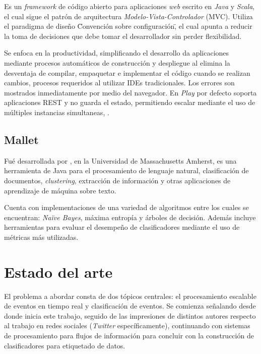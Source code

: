 Es un \textit{framework} de código abierto para aplicaciones \textit{web} escrito en \textit{Java} y \textit{Scala}, el cual sigue el patrón de arquitectura \textit{Modelo-Vista-Controlador} (MVC). Utiliza el paradigma de diseño \"Convención sobre configuración\", el cual apunta a reducir la toma de decisiones que debe tomar el desarrollador sin perder flexibilidad. 

Se enfoca en la productividad, simplificando el desarrollo da aplicaciones mediante procesos automáticos de construcción y despliegue al elimina la desventaja de compilar, empaquetar e implementar el código cuando se realizan cambios, procesos requeridos al utilizar IDEs tradicionales. Los errores son mostrados inmediatamente por medio del navegador. En \textit{Play} por defecto soporta aplicaciones REST y no guarda el estado, permitiendo escalar mediante el uso de múltiples instancias simultaneas, \cite{PlayFramework}.

\subsection*{Mallet}
\label{subsubsec:mallet}

Fué desarrollada por \cite{Mallet}, en la Universidad de Massachusetts Amherst, es una herramienta de Java para el procesamiento de lenguaje natural, clasificación de documentos, \textit{clustering}, extracción de información y otras aplicaciones de aprendizaje de máquina sobre texto.

Cuenta con implementaciones de una variedad de algoritmos entre los cuales se encuentran: \textit{Naïve Bayes}, máxima entropía y árboles de decisión. Además incluye herramientas para evaluar el desempeño de clasificadores mediante el uso de métricas más utilizadas.

\section{Estado del arte}
\label{intro:motivacion:arte}

El problema a abordar consta de dos tópicos centrales: el procesamiento escalable de eventos en tiempo real y clasificación de eventos. Se comienza señalando desde donde inicia este trabajo, seguido de las impresiones de distintos autores respecto al trabajo en redes sociales (\textit{Twitter} específicamente), continuando con sistemas de procesamiento para flujos de información para concluir con la construcción de clasificadores para etiquetado de datos.

